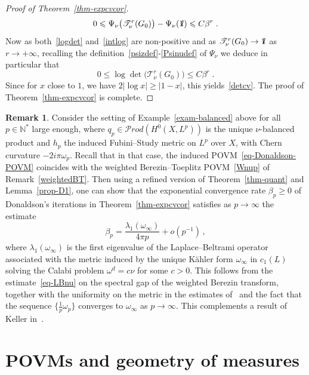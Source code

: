 \documentclass[11pt]{article}
\theoremstyle{definition}
\newtheorem{rema}[theo]{Remark}
\numberwithin{equation}{section}
\numberwithin{figure}{section}
\numberwithin{table}{section}
\let\cal\mathscr
\newcommand{\N}{{\mathbb{N}}}
\newcommand*\id{{1\hskip-2.5pt{\rm l}}}
\newcommand{\om}{{\omega}}
\renewcommand\leq {\leqslant}
\renewcommand\geq {\geqslant}
\newcommand\< {\mathcal{h}}
\renewcommand\> {\mathcal{i}}
\newcommand\TT {{\cal T}}
\newcommand{\Prod}{{\mathcal Prod}}
\begin{document}
\begin{proof}[Proof of Theorem~\ref{thm-expcvcor}]
\begin{equation}
0\leq\Psi_\nu\big(\TT^r_\nu(G_0)\big)-\Psi_\nu(\id)\leq C\beta^r
\;.
\end{equation}
Now as both~\eqref{logdet} and~\eqref{intlog} are non-positive and as $\TT^r_\nu(G_0)\to\id$ as $r\to +\infty$, recalling the definition~\eqref{psizdef}-\eqref{Psinudef} of $\Psi_\nu$ we deduce in particular that
\begin{equation}
0\leq\log\det\big(\TT^r_\nu(G_0)\big)\leq C\beta^r\;.
\end{equation}
Since for $x$ close to $1$, we have $2|\log x | \geq |1-x|$, this yields~\eqref{detcv}. The proof of Theorem~\ref{thm-expcvcor} is complete.
\end{proof}


\begin{rema}\label{thmquantnu}
Consider the setting of Example~\ref{exam-balanced} above for all $p\in\N^*$ large enough, where $q_p\in\Prod(H^0(X,L^p))$ is the unique $\nu$-balanced product and $h_p$ the induced Fubini--Study metric on $L^p$ over $X$, with Chern curvature $-2i\pi\om_p$. Recall that in that case, the induced POVM~\eqref{eq-Donaldson-POVM} coincides with the weighted Berezin--Toeplitz POVM~\eqref{Wnup} of Remark~\ref{weightedBT}. Then using a refined version of Theorem~\ref{thm-quant} and Lemma~\ref{prop-D1}, one can show that the exponential convergence rate $\beta_p\geq 0$ of Donaldson's iterations in Theorem~\ref{thm-expcvcor} satisfies as $p\rightarrow\infty$ the estimate
\begin{equation}\label{thmquantunif}
\beta_p=\frac{\lambda_1(\om_\infty)}{4\pi p}+o\left(p^{-1}\right)\,,
\end{equation}
where $\lambda_1(\om_\infty)$ is the first eigenvalue of the Laplace--Beltrami operator associated with the metric induced by the unique K\"ahler form $\om_\infty$ in $c_1(L)$ solving the Calabi problem $\om^d=c\nu$ for some $c>0$. This follows from the estimate~\eqref{eq-LBnu} on the spectral gap of the weighted Berezin transform, together with the uniformity on the metric in the estimates of~\cite[Theorem~4.18']{DLM06} and the fact that the sequence $\{\frac{1}{p}\om_p\}$ converges to $\om_\infty$ as $p\rightarrow\infty$. This complements a result of Keller in~\cite[Proposition~4.7]{Keller09}.
\end{rema}



\section{POVMs and geometry of measures} \label{sec-bestfit}
\end{document}

